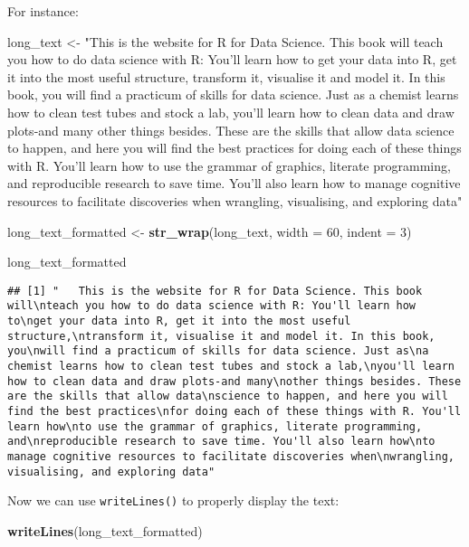 \documentclass[]{article}
\newenvironment{Shaded}{\begin{snugshade}}{\end{snugshade}}
\newcommand{\KeywordTok}[1]{\textcolor[rgb]{0.13,0.29,0.53}{\textbf{#1}}}
\newcommand{\DataTypeTok}[1]{\textcolor[rgb]{0.13,0.29,0.53}{#1}}
\newcommand{\DecValTok}[1]{\textcolor[rgb]{0.00,0.00,0.81}{#1}}
\newcommand{\StringTok}[1]{\textcolor[rgb]{0.31,0.60,0.02}{#1}}
\newcommand{\NormalTok}[1]{#1}
\theoremstyle{definition}
\theoremstyle{definition}
\theoremstyle{definition}
\theoremstyle{remark}
\begin{document}
For instance:

\begin{Shaded}
\begin{Highlighting}[]
\NormalTok{long_text <-}\StringTok{ "This is the website for R for Data Science. This book will teach you how to do data science with R: You'll learn how to get your data into R, get it into the most useful structure, transform it, visualise it and model it. In this book, you will find a practicum of skills for data science. Just as a chemist learns how to clean test tubes and stock a lab, you'll learn how to clean data and draw plots-and many other things besides. These are the skills that allow data science to happen, and here you will find the best practices for doing each of these things with R. You'll learn how to use the grammar of graphics, literate programming, and reproducible research to save time. You'll also learn how to manage cognitive resources to facilitate discoveries when wrangling, visualising, and exploring data"}

\NormalTok{long_text_formatted <-}\StringTok{ }\KeywordTok{str_wrap}\NormalTok{(long_text, }\DataTypeTok{width =} \DecValTok{60}\NormalTok{, }\DataTypeTok{indent =} \DecValTok{3}\NormalTok{)}

\NormalTok{long_text_formatted}
\end{Highlighting}
\end{Shaded}

\begin{verbatim}
## [1] "   This is the website for R for Data Science. This book will\nteach you how to do data science with R: You'll learn how to\nget your data into R, get it into the most useful structure,\ntransform it, visualise it and model it. In this book, you\nwill find a practicum of skills for data science. Just as\na chemist learns how to clean test tubes and stock a lab,\nyou'll learn how to clean data and draw plots-and many\nother things besides. These are the skills that allow data\nscience to happen, and here you will find the best practices\nfor doing each of these things with R. You'll learn how\nto use the grammar of graphics, literate programming, and\nreproducible research to save time. You'll also learn how\nto manage cognitive resources to facilitate discoveries when\nwrangling, visualising, and exploring data"
\end{verbatim}

Now we can use \texttt{writeLines()} to properly display the text:

\begin{Shaded}
\begin{Highlighting}[]
\KeywordTok{writeLines}\NormalTok{(long_text_formatted)}
\end{Highlighting}
\end{Shaded}
\end{document}
